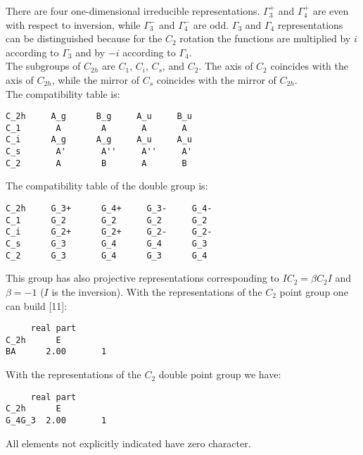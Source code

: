 \documentclass[12pt,a4paper]{article}
\begin{document}
There are four one-dimensional irreducible representations. $\Gamma_3^+$
and $\Gamma_4^+$ are even with respect to inversion, while
$\Gamma_3^-$ and $\Gamma_4^-$ are odd. $\Gamma_3$ and $\Gamma_4$ 
representations can be distinguished because for the $C_2$ rotation
the functions are multiplied by $i$ according to $\Gamma_3$ and 
by $-i$ according to $\Gamma_4$. \\
The subgroups of $C_{2h}$ are $C_1$, $C_i$, $C_s$, and $C_2$. The
axis of $C_2$ coincides with the axis of $C_{2h}$, while the 
mirror of $C_s$ coincides with the mirror of $C_{2h}$.\\
The compatibility table is:
\begin{verbatim}
C_2h     A_g      B_g     A_u     B_u
C_1       A        A       A       A
C_i      A_g      A_g     A_u     A_u
C_s       A'       A''     A''     A'
C_2       A        B       A       B
\end{verbatim}
The compatibility table of the double group is:
\begin{verbatim}
C_2h     G_3+      G_4+     G_3-     G_4- 
C_1      G_2       G_2      G_2      G_2
C_i      G_2+      G_2+     G_2-     G_2-
C_s      G_3       G_4      G_4      G_3
C_2      G_3       G_4      G_3      G_4
\end{verbatim}
This group has also projective representations corresponding to
$IC_2 = \beta C_2 I$ and $\beta=-1$ ($I$ is the inversion).
With the representations of the $C_2$ point group one can build [11]:
\begin{verbatim}
     real part
C_2h      E     
BA      2.00       1
\end{verbatim}
With the representations of the $C_2$ double point group we have:
\begin{verbatim}
     real part
C_2h      E     
G_4G_3  2.00       1
\end{verbatim}
All elements not explicitly indicated have zero character.

\newpage
\end{document}
